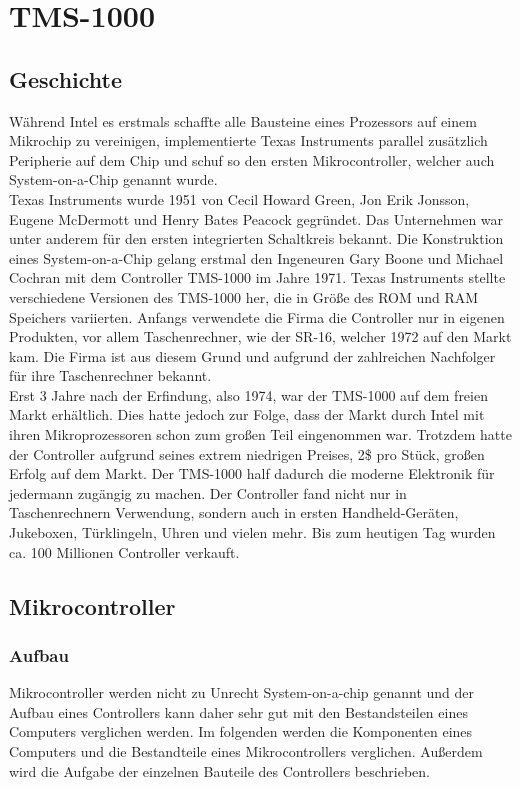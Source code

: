 	\chapter{TMS-1000}

\newpage

\section{Geschichte}

W{\"a}hrend Intel es erstmals schaffte alle Bausteine eines Prozessors auf einem Mikrochip zu vereinigen, implementierte Texas Instruments parallel zus{\"a}tzlich Peripherie auf dem Chip und schuf so den ersten Mikrocontroller, welcher auch System-on-a-Chip genannt wurde. \\
Texas Instruments wurde 1951 von Cecil Howard Green, Jon Erik Jonsson, Eugene McDermott und Henry Bates Peacock gegr{\"u}ndet. Das Unternehmen war unter anderem f{\"u}r den ersten integrierten Schaltkreis bekannt. Die Konstruktion eines System-on-a-Chip gelang erstmal den Ingeneuren Gary Boone und Michael Cochran mit dem Controller TMS-1000 im Jahre 1971. Texas Instruments stellte verschiedene Versionen des TMS-1000 her, die in Gr{\"o}{\ss}e des ROM und RAM Speichers variierten. Anfangs verwendete die Firma die Controller nur in eigenen Produkten, vor allem Taschenrechner, wie der SR-16, welcher 1972 auf den Markt kam. Die Firma ist aus diesem Grund und aufgrund der zahlreichen Nachfolger f{\"u}r ihre Taschenrechner bekannt. \\
Erst 3 Jahre nach der Erfindung, also 1974, war der TMS-1000 auf dem freien Markt erh{\"a}ltlich. Dies hatte jedoch zur Folge, dass der Markt durch Intel mit ihren Mikroprozessoren schon zum gro{\ss}en Teil eingenommen war. Trotzdem hatte der Controller aufgrund seines extrem niedrigen Preises, 2\$ pro St{\"u}ck, gro{\ss}en Erfolg auf dem Markt. Der TMS-1000 half dadurch die moderne Elektronik f{\"u}r jedermann zug{\"a}ngig zu machen. Der Controller fand nicht nur in Taschenrechnern Verwendung, sondern auch in ersten Handheld-Ger{\"a}ten, Jukeboxen, T{\"u}rklingeln, Uhren und vielen mehr. Bis zum heutigen Tag wurden ca. 100 Millionen Controller verkauft.

\section{Mikrocontroller}
\subsection{Aufbau}
Mikrocontroller werden nicht zu Unrecht System-on-a-chip genannt und der Aufbau eines Controllers kann daher sehr gut mit den Bestandsteilen eines Computers verglichen werden. Im folgenden werden die Komponenten eines Computers und die Bestandteile eines Mikrocontrollers verglichen. Au{\ss}erdem wird die Aufgabe der einzelnen Bauteile des Controllers beschrieben. 

